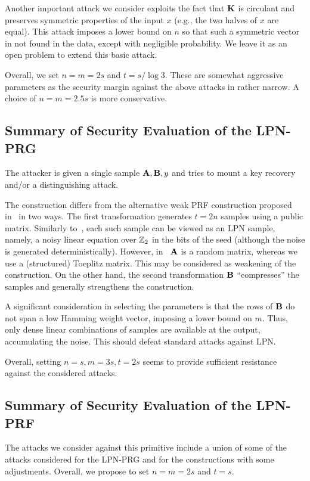 Another important attack we consider exploits the fact that $\mat{K}$
is circulant and preserves symmetric properties of the input $x$ (e.g., the two halves of $x$ are equal). 
This attack imposes a lower bound on $n$ so that such a symmetric vector in not found
in the data, except with negligible probability. 
We leave it as an open problem to extend this basic attack.


Overall, we set $n=m=2s$ and $t = s/\log 3$.
These are somewhat aggressive parameters as the security margin against the above attacks
in rather narrow. A choice of $n=m=2.5s$ is more conservative.

\subsection{Summary of Security Evaluation of the LPN-PRG}

The attacker is given a single sample $\mat{A},\mat{B},y$
and tries to mount a key recovery and/or a distinguishing attack.

The construction differs from 
the alternative weak PRF construction proposed
in~\cite{boneh2018-darkmatter} in two ways.
The first transformation generates $t = 2n$ samples using a public matrix.
Similarly to~\cite{boneh2018-darkmatter},
each such sample can be viewed as an LPN sample, namely,
a noisy linear equation over $\mathbb{Z}_2$ in the bits of the seed
(although the noise is generated deterministically).
However, in~\cite{boneh2018-darkmatter} $\mat{A}$ is a random matrix,
whereas we use a (structured) Toeplitz matrix.
This may be considered as weakening of the construction. 
On the other hand, the second transformation $\mat{B}$ ``compresses''
the samples and generally strengthens the construction.

A significant consideration in selecting the parameters is that
the rows of $\mat{B}$ do not span a low Hamming weight vector,
imposing a lower bound on $m$.
Thus, only dense linear combinations of samples are available at the output,
accumulating the noise. This should defeat standard attacks against LPN. 

Overall, setting 
$n=s, m = 3s, t = 2s$ seems to provide sufficient 
resistance against the considered attacks.



\subsection{Summary of Security Evaluation of the LPN-PRF}

The attacks we consider against this primitive include a union of some
of the attacks considered for the LPN-PRG and for the \ttwPRF constructions
with some adjustments. Overall, we propose to set $n=m= 2s$ and $t =s$.
